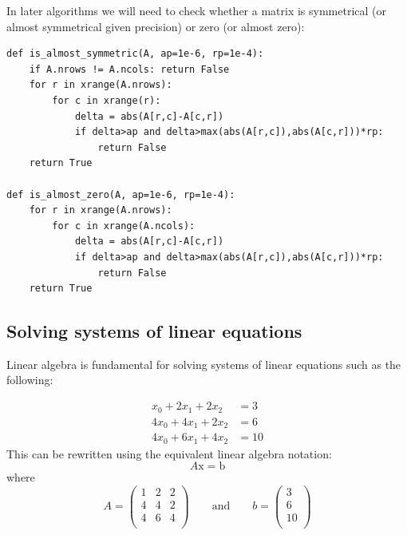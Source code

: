 \documentclass[justified,sixbynine]{tufte-book}
\def\ft{\small\tt}
\theoremstyle{plain}%
\theoremstyle{definition}
\theoremstyle{remark}
\begin{document}
\begin{fullwidth}

In later algorithms we will need to check whether a matrix is symmetrical (or almost symmetrical given precision) or zero (or almost zero):

\begin{lstlisting}[caption={in file: {\ft nlib.py}}]
def is_almost_symmetric(A, ap=1e-6, rp=1e-4):
    if A.nrows != A.ncols: return False
    for r in xrange(A.nrows):
        for c in xrange(r):
            delta = abs(A[r,c]-A[c,r])
            if delta>ap and delta>max(abs(A[r,c]),abs(A[c,r]))*rp:
                return False
    return True

def is_almost_zero(A, ap=1e-6, rp=1e-4):
    for r in xrange(A.nrows):
        for c in xrange(A.ncols):
            delta = abs(A[r,c]-A[c,r])
            if delta>ap and delta>max(abs(A[r,c]),abs(A[c,r]))*rp:
                return False
    return True
\end{lstlisting}

\goodbreak\subsection{Solving systems of linear equations}


Linear algebra is fundamental for solving systems of linear equations such as the following:

\begin{align}
x_0+2x_1+2x_2 &=3 \\
4x_0+4x_1+2x_2&=6 \\
4x_0+6x_1+4x_2&=10
\end{align}
This can be rewritten using the equivalent linear algebra notation:
\begin{equation}
A \textrm{x} = \textrm{b}
\end{equation}
where
\begin{equation}
A = \begin{pmatrix}
1 & 2 & 2 \\
4 & 4 & 2 \\
4 & 6 & 4 \\
\end{pmatrix} \qquad \text{and} \qquad
b =
\begin{pmatrix}
3 \\
6 \\
10 \\
\end{pmatrix}
\end{equation}


\end{fullwidth}
\end{document}
